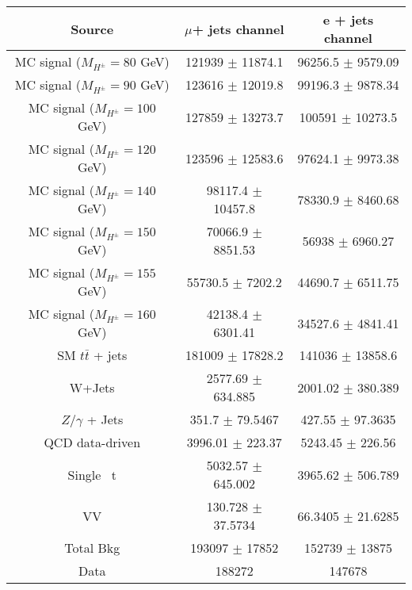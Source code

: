\begin{tabular}{ | c| c| c|}
\hline 
\multicolumn{1}{|c|}{Source} & \multicolumn{1}{|c|}{$\mu$+ jets channel} &
\multicolumn{1}{|c|}{e + jets channel}\\
\hline 
\hline 
MC signal ($M_{H^\pm}=80$ GeV)  & 121939  $\pm$ 11874.1& 96256.5 $\pm$ 9579.09\\ 
MC signal ($M_{H^\pm}=90$ GeV)  & 123616  $\pm$ 12019.8& 99196.3 $\pm$ 9878.34\\ 
MC signal ($M_{H^\pm}=100$ GeV) & 127859  $\pm$ 13273.7& 100591  $\pm$ 10273.5\\ 
MC signal ($M_{H^\pm}=120$ GeV) & 123596  $\pm$ 12583.6& 97624.1 $\pm$ 9973.38\\ 
MC signal ($M_{H^\pm}=140$ GeV) & 98117.4 $\pm$ 10457.8& 78330.9 $\pm$ 8460.68\\ 
MC signal ($M_{H^\pm}=150$ GeV) & 70066.9 $\pm$ 8851.53& 56938   $\pm$ 6960.27\\ 
MC signal ($M_{H^\pm}=155$ GeV) & 55730.5 $\pm$ 7202.2 & 44690.7 $\pm$ 6511.75\\ 
MC signal ($M_{H^\pm}=160$ GeV) & 42138.4 $\pm$ 6301.41& 34527.6 $\pm$ 4841.41\\ 
\hline 
SM $t\bar{t}$ + jets    & 181009  $\pm$ 17828.2 & 141036  $\pm$ 13858.6\\ 
W+Jets                  & 2577.69 $\pm$ 634.885 & 2001.02 $\pm$ 380.389\\ 
$Z/\gamma$ + Jets       & 351.7   $\pm$ 79.5467 & 427.55  $\pm$ 97.3635\\ 
QCD data-driven         & 3996.01 $\pm$ 223.37  & 5243.45 $\pm$ 226.56\\ 
Single ~t               & 5032.57 $\pm$ 645.002 & 3965.62 $\pm$ 506.789\\ 
VV                      & 130.728 $\pm$ 37.5734 & 66.3405 $\pm$ 21.6285\\ 
\hline                                                                     
Total Bkg               & 193097  $\pm$ 17852   & 152739  $\pm$  13875 \\ 
\hline                                                                       
 Data                   & 188272                & 147678 \\ 
\hline 
\hline 
\end{tabular}
